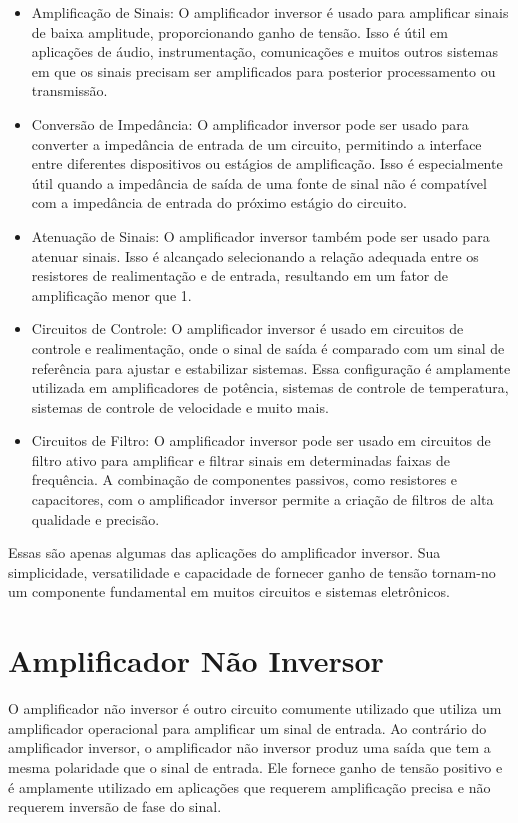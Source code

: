 \documentclass[12pt,twoside, a4paper, twocolumn]{article}
\begin{document}
\begin{itemize}
    \item Amplificação de Sinais: O amplificador inversor é usado para amplificar sinais de baixa amplitude, proporcionando ganho de tensão. Isso é útil em aplicações de áudio, instrumentação, comunicações e muitos outros sistemas em que os sinais precisam ser amplificados para posterior processamento ou transmissão.
    \item Conversão de Impedância: O amplificador inversor pode ser usado para converter a impedância de entrada de um circuito, permitindo a interface entre diferentes dispositivos ou estágios de amplificação. Isso é especialmente útil quando a impedância de saída de uma fonte de sinal não é compatível com a impedância de entrada do próximo estágio do circuito.
    \item Atenuação de Sinais: O amplificador inversor também pode ser usado para atenuar sinais. Isso é alcançado selecionando a relação adequada entre os resistores de realimentação e de entrada, resultando em um fator de amplificação menor que 1.
    \item Circuitos de Controle: O amplificador inversor é usado em circuitos de controle e realimentação, onde o sinal de saída é comparado com um sinal de referência para ajustar e estabilizar sistemas. Essa configuração é amplamente utilizada em amplificadores de potência, sistemas de controle de temperatura, sistemas de controle de velocidade e muito mais.
    \item Circuitos de Filtro: O amplificador inversor pode ser usado em circuitos de filtro ativo para amplificar e filtrar sinais em determinadas faixas de frequência. A combinação de componentes passivos, como resistores e capacitores, com o amplificador inversor permite a criação de filtros de alta qualidade e precisão.
\end{itemize}

Essas são apenas algumas das aplicações do amplificador inversor. Sua simplicidade, versatilidade e capacidade de fornecer ganho de tensão tornam-no um componente fundamental em muitos circuitos e sistemas eletrônicos.

\newpage
\section{Amplificador Não Inversor}

O amplificador não inversor é outro circuito comumente utilizado que utiliza um amplificador operacional para amplificar um sinal de entrada. Ao contrário do amplificador inversor, o amplificador não inversor produz uma saída que tem a mesma polaridade que o sinal de entrada. Ele fornece ganho de tensão positivo e é amplamente utilizado em aplicações que requerem amplificação precisa e não requerem inversão de fase do sinal.
\end{document}
